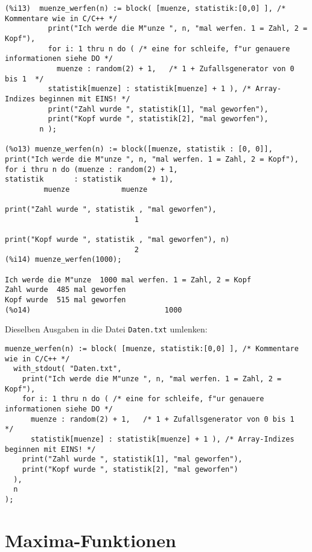 \documentclass[spanish,12pt,a4paper]{article}
\begin{document}
\scriptsize
\begin{verbatim}
(%i13)  muenze_werfen(n) := block( [muenze, statistik:[0,0] ], /* Kommentare wie in C/C++ */
          print("Ich werde die M"unze ", n, "mal werfen. 1 = Zahl, 2 = Kopf"),
          for i: 1 thru n do ( /* eine for schleife, f"ur genauere informationen siehe DO */
            muenze : random(2) + 1,   /* 1 + Zufallsgenerator von 0 bis 1  */
          statistik[muenze] : statistik[muenze] + 1 ), /* Array-Indizes beginnen mit EINS! */
          print("Zahl wurde ", statistik[1], "mal geworfen"),
          print("Kopf wurde ", statistik[2], "mal geworfen"),
        n );

(%o13) muenze_werfen(n) := block([muenze, statistik : [0, 0]], 
print("Ich werde die M"unze ", n, "mal werfen. 1 = Zahl, 2 = Kopf"), 
for i thru n do (muenze : random(2) + 1, 
statistik       : statistik       + 1), 
         muenze            muenze

print("Zahl wurde ", statistik , "mal geworfen"), 
                              1

print("Kopf wurde ", statistik , "mal geworfen"), n)
                              2
(%i14) muenze_werfen(1000);

Ich werde die M"unze  1000 mal werfen. 1 = Zahl, 2 = Kopf 
Zahl wurde  485 mal geworfen 
Kopf wurde  515 mal geworfen 
(%o14)                               1000
\end{verbatim}
\normalsize

Dieselben Ausgaben in die Datei \verb|Daten.txt| umlenken:

\scriptsize
\begin{verbatim}
muenze_werfen(n) := block( [muenze, statistik:[0,0] ], /* Kommentare wie in C/C++ */
  with_stdout( "Daten.txt", 
    print("Ich werde die M"unze ", n, "mal werfen. 1 = Zahl, 2 = Kopf"),
    for i: 1 thru n do ( /* eine for schleife, f"ur genauere informationen siehe DO */
      muenze : random(2) + 1,   /* 1 + Zufallsgenerator von 0 bis 1  */
      statistik[muenze] : statistik[muenze] + 1 ), /* Array-Indizes beginnen mit EINS! */
    print("Zahl wurde ", statistik[1], "mal geworfen"),
    print("Kopf wurde ", statistik[2], "mal geworfen")
  ),
  n 
);
\end{verbatim}
\normalsize




\section{Maxima-Funktionen}
\end{document}
